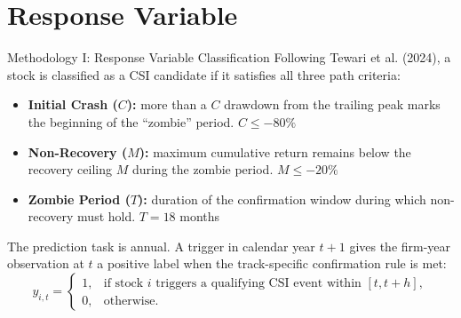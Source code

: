\documentclass[10pt]{beamer}\usepackage[]{graphicx}\usepackage[table]{xcolor}
\begin{document}
\section{Response Variable}
\begin{frame}{Methodology I: Response Variable Classification}
\small
Following Tewari et al. (2024), a stock is classified as a CSI candidate if it satisfies all three path criteria:

\vspace{0.3em}
\begin{itemize}
  \setlength\itemsep{0.4em}
  \item \textbf{Initial Crash ($C$):} more than a $C$ drawdown from the trailing peak marks the beginning of the ``zombie'' period.  \hfill \textcolor{warningRed}{\small $C \leq -80\%$}
  \item \textbf{Non-Recovery ($M$):} maximum cumulative return remains below the recovery ceiling $M$ during the zombie period. \hfill \textcolor{warningRed}{\small $M \leq -20\%$}
  \item \textbf{Zombie Period ($T$):} duration of the confirmation window during which non-recovery must hold. \hfill \textcolor{warningRed}{\small $T = 18$ months}
\end{itemize}

\vspace{0.35em}
The prediction task is annual. A trigger in calendar year $t+1$ gives the firm-year observation at $t$ a positive label when the track-specific confirmation rule is met:
\begin{equation*}
y_{i,t} =
\begin{cases}
1, & \text{if stock } i \text{ triggers a qualifying CSI event within } [t,t+h],\\
0, & \text{otherwise}.
\end{cases}
\end{equation*}

\end{frame}

\end{document}
